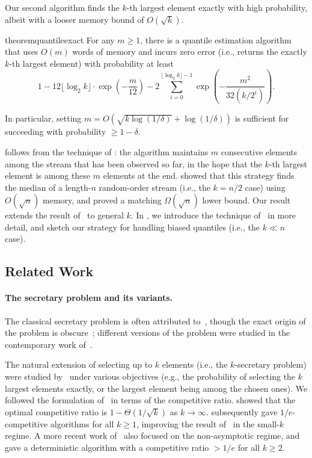 Our second algorithm finds the $k$-th largest element exactly with high probability, albeit with a looser memory bound of $O(\sqrt{k})$.

\begin{restatable}{theorem}{quantileexact}\label{thm:quantile-exact}
    For any $m \ge 1$, there is a quantile estimation algorithm that uses $O(m)$ words of memory and incurs zero error (i.e., returns the exactly $k$-th largest element) with probability at least
    \[
        1 - 12\lfloor\log_2k\rfloor\cdot\exp\left(-\frac{m}{12}\right) - 2\sum_{i=0}^{\lfloor\log_2k\rfloor-1}\exp\left(- \frac{m^2}{32(k/2^i)}\right).
    \]
\end{restatable}

In particular, setting $m = O(\sqrt{k\log(1/\delta)} + \log(1/\delta))$ is sufficient for succeeding with probability $\ge 1 - \delta$.

 follows from the technique of \cite{MP80}: the algorithm maintains $m$ consecutive elements among the stream that has been observed so far, in the hope that the $k$-th largest element is among these $m$ elements at the end. \cite{MP80} showed that this strategy finds the median of a length-$n$ random-order stream (i.e., the $k = n/2$ case) using $O(\sqrt{n})$ memory, and proved a matching $\Omega(\sqrt{n})$ lower bound. Our result extends the result of~\cite{MP80} to general $k$. In , we introduce the technique of~\cite{MP80} in more detail, and sketch our strategy for handling biased quantiles (i.e., the $k \ll n$ case).

\subsection{Related Work}
\paragraph{The secretary problem and its variants.} 
The classical secretary problem is often attributed to~\cite{dynkin1963optimum}, though the exact origin of the problem is obscure~\cite{freeman1983secretary,Ferguson1989}; different versions of the problem were studied in the contemporary work of~\cite{Lindley61,CMRS64,GM66}. 

The natural extension of selecting up to $k$ elements (i.e., the $k$-secretary problem) were studied by~\cite{GM66,AMW01,Kleinberg05,BIKK07} under various objectives (e.g., the probability of selecting the $k$ largest elements exactly, or the largest element being among the chosen ones). We followed the formulation of~\cite{Kleinberg05} in terms of the competitive ratio. \cite{Kleinberg05} showed that the optimal competitive ratio is $1 - \Theta(1/\sqrt{k})$ as $k \to \infty$. \cite{BIKK07} subsequently gave $1/e$-competitive algorithms for all $k \ge 1$, improving the result of~\cite{Kleinberg05} in the small-$k$ regime. A more recent work of~\cite{AL21} also focused on the non-asymptotic regime, and gave a deterministic algorithm with a competitive ratio $> 1/e$ for all $k \ge 2$.

